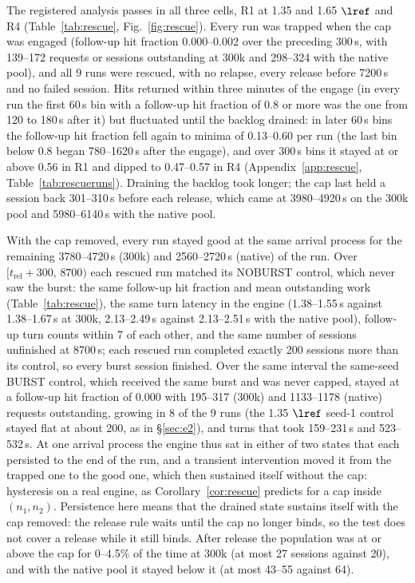 The registered analysis passes in all three cells, R1 at 1.35 and 1.65 $\lref$ and R4 (Table~\ref{tab:rescue}, Fig.~\ref{fig:rescue}). Every run was trapped when the cap was engaged (follow-up hit fraction 0.000--0.002 over the preceding 300\,s, with 139--172 requests or sessions outstanding at 300k and 298--324 with the native pool), and all 9 runs were rescued, with no relapse, every release before 7200\,s and no failed session. Hits returned within three minutes of the engage (in every run the first 60\,s bin with a follow-up hit fraction of 0.8 or more was the one from 120 to 180\,s after it) but fluctuated until the backlog drained: in later 60\,s bins the follow-up hit fraction fell again to minima of 0.13--0.60 per run (the last bin below 0.8 began 780--1620\,s after the engage), and over 300\,s bins it stayed at or above 0.56 in R1 and dipped to 0.47--0.57 in R4 (Appendix~\ref{app:rescue}, Table~\ref{tab:rescueruns}). Draining the backlog took longer; the cap last held a session back 301--310\,s before each release, which came at 3980--4920\,s on the 300k pool and 5980--6140\,s with the native pool.

With the cap removed, every run stayed good at the same arrival process for the remaining 3780--4720\,s (300k) and 2560--2720\,s (native) of the run. Over $[t_{\mathrm{rel}}+300,\,8700)$ each rescued run matched its NOBURST control, which never saw the burst: the same follow-up hit fraction and mean outstanding work (Table~\ref{tab:rescue}), the same turn latency in the engine (1.38--1.55\,s against 1.38--1.67\,s at 300k, 2.13--2.49\,s against 2.13--2.51\,s with the native pool), follow-up turn counts within 7 of each other, and the same number of sessions unfinished at 8700\,s; each rescued run completed exactly 200 sessions more than its control, so every burst session finished. Over the same interval the same-seed BURST control, which received the same burst and was never capped, stayed at a follow-up hit fraction of 0.000 with 195--317 (300k) and 1133--1178 (native) requests outstanding, growing in 8 of the 9 runs (the 1.35 $\lref$ seed-1 control stayed flat at about 200, as in \S\ref{sec:e2}), and turns that took 159--231\,s and 523--532\,s. At one arrival process the engine thus sat in either of two states that each persisted to the end of the run, and a transient intervention moved it from the trapped one to the good one, which then sustained itself without the cap: hysteresis on a real engine, as Corollary~\ref{cor:rescue} predicts for a cap inside $(n_1,n_2)$. Persistence here means that the drained state sustains itself with the cap removed: the release rule waits until the cap no longer binds, so the test does not cover a release while it still binds. After release the population was at or above the cap for 0--4.5\% of the time at 300k (at most 27 sessions against 20), and with the native pool it stayed below it (at most 43--55 against 64).

